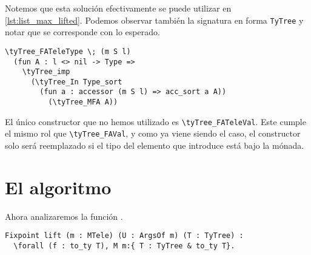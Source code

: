 Notemos que esta solución efectivamente se puede utilizar en \ref{lst:list_max_lifted}. Podemos observar también la signatura en forma \lstinline{TyTree} y notar que se corresponde con lo esperado.

\begin{lstlisting}[frame=tb,caption={Signatura en \lstinline{TyTree} de \lstinline{ret^}},label=lst:exmp_ret_tytree]
\tyTree_FATeleType \; (m S l)
  (fun A : l <> nil -> Type =>
    \tyTree_imp
      (\tyTree_In Type_sort
        (fun a : accessor (m S l) => acc_sort a A))
          (\tyTree_MFA A))
\end{lstlisting}

El único constructor que no hemos utilizado es \lstinline{\tyTree_FATeleVal}.
Este cumple el mismo rol que \lstinline{\tyTree_FAVal}, y como ya viene siendo el caso, el constructor solo será reemplazado si el tipo del elemento que introduce está bajo la mónada.

\iffalse
Tomemos una función de ejemplo con la siguiente signatura.

\begin{lstlisting}
\forall (T : Type) (R : T -> Type) (t : T), M (R t)
$\equiv$
\tyTree_FAType \; (fun T => \tyTree_FAType \; (fun R : T -> Type => \tyTree_FAVal \; T (fun t => \tyTree_M \; (R t))))
\end{lstlisting}

La traducción será muy directa.

\begin{lstlisting}
\tyTree_FAType \; (fun T => \tyTree_FATeleType \; (fun R : T -> Type => \tyTree_FATeleVal \; T (fun t => \tyTree_M \; (R t))))
\end{lstlisting}

Notar que el primer constructor no es reemplazado ya que \lstinline{T} no se encuentra bajo la mónada en ningún momento.
\fi

\section{El algoritmo}

Ahora analizaremos la función \lift.

\begin{lstlisting}[frame=tb,caption={Signatura de \lift},label=lst:tipo_lift]
Fixpoint lift (m : MTele) (U : ArgsOf m) (T : TyTree) :
  \forall (f : to_ty T), M m:{ T : TyTree & to_ty T}.
\end{lstlisting}

